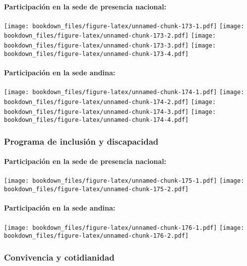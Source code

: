 \documentclass[]{article}
\let\oldparagraph\paragraph
\renewcommand{\paragraph}[1]{\oldparagraph{#1}\mbox{}}
\theoremstyle{definition}
\theoremstyle{definition}
\theoremstyle{definition}
\theoremstyle{remark}
\begin{document}
\paragraph{Participación en la sede de presencia
nacional:}\label{participacion-en-la-sede-de-presencia-nacional-3}

\texttt{[image: bookdown\_files/figure-latex/unnamed-chunk-173-1.pdf]}
\texttt{[image: bookdown\_files/figure-latex/unnamed-chunk-173-2.pdf]}
\texttt{[image: bookdown\_files/figure-latex/unnamed-chunk-173-3.pdf]}
\texttt{[image: bookdown\_files/figure-latex/unnamed-chunk-173-4.pdf]}

\paragraph{Participación en la sede
andina:}\label{participacion-en-la-sede-andina-3}

\texttt{[image: bookdown\_files/figure-latex/unnamed-chunk-174-1.pdf]}
\texttt{[image: bookdown\_files/figure-latex/unnamed-chunk-174-2.pdf]}
\texttt{[image: bookdown\_files/figure-latex/unnamed-chunk-174-3.pdf]}
\texttt{[image: bookdown\_files/figure-latex/unnamed-chunk-174-4.pdf]}

\subsubsection{Programa de inclusión y
discapacidad}\label{programa-de-inclusion-y-discapacidad-1}

\paragraph{Participación en la sede de presencia
nacional:}\label{participacion-en-la-sede-de-presencia-nacional-4}

\texttt{[image: bookdown\_files/figure-latex/unnamed-chunk-175-1.pdf]}
\texttt{[image: bookdown\_files/figure-latex/unnamed-chunk-175-2.pdf]}

\paragraph{Participación en la sede
andina:}\label{participacion-en-la-sede-andina-4}

\texttt{[image: bookdown\_files/figure-latex/unnamed-chunk-176-1.pdf]}
\texttt{[image: bookdown\_files/figure-latex/unnamed-chunk-176-2.pdf]}

\subsubsection{Convivencia y
cotidianidad}\label{convivencia-y-cotidianidad-1}
\end{document}
